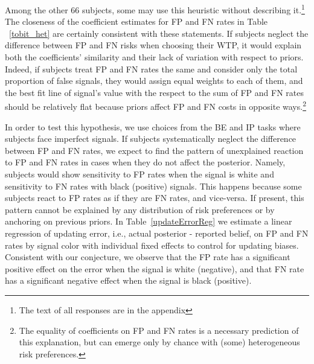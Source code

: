 \documentclass[12pt,a4paper]{article}
\begin{document}
Among the other 66 subjects, some may use this heuristic without describing it.\footnote{The text of all responses are in the appendix}  The closeness of the coefficient estimates for FP and FN rates in Table ~\ref{tobit_het} are certainly consistent with these statements. If subjects neglect the difference between FP and FN risks when choosing their WTP, it would explain both the coefficients' similarity and their lack of variation with respect to priors. Indeed, if subjects treat FP and FN rates the same and consider only the total proportion of false signals, they would assign equal weights to each of them, and the best fit line of signal's value with the respect to the sum of FP and FN rates should be relatively flat because priors affect FP and FN costs in opposite ways.\footnote{The equality of coefficients on FP and FN rates is a necessary prediction of this explanation, but can emerge only by chance with (some) heterogeneous risk preferences.}

In order to test this hypothesis, we use choices from the BE and IP tasks where subjects face imperfect signals. If subjects systematically neglect the difference between FP and FN rates, we expect to find the pattern of unexplained reaction to FP and FN rates in cases when they do not affect the posterior. Namely, subjects would show sensitivity to FP rates when the signal is white and sensitivity to FN rates with black (positive) signals. This happens because some subjects react to FP rates as if they are FN rates, and vice-versa. If present, this pattern cannot be explained by any distribution of risk preferences or by anchoring on previous priors.  In Table~\ref{updateErrorReg} we estimate a linear regression of updating error, i.e., actual posterior - reported belief, on FP and FN rates by signal color with individual fixed effects to control for updating biases. Consistent with our conjecture, we observe that the FP rate has a significant positive effect on the error when the signal is white (negative), and that FN rate has a significant negative effect when the signal is black (positive). 



\end{document}
